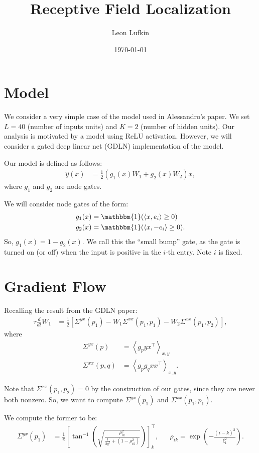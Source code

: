 \documentclass{article}
\title{Receptive Field Localization}
\author{Leon Lufkin}
\date{\today}
\begin{document}
\section{Model}
We consider a very simple case of the model used in Alessandro's paper.
We set $L = 40$ (number of inputs units) and $K = 2$ (number of hidden units).
Our analysis is motivated by a model using ReLU activation.
However, we will consider a gated deep linear net (GDLN) implementation of the model.

Our model is defined as follows:
\begin{align}
  \hat{y}(x) &= \frac{1}{2} \left( g_1(x) W_1 + g_2(x) W_2 \right) x, \label{eq:model}
\end{align}
where $g_1$ and $g_2$ are node gates.

We will consider node gates of the form:
\begin{align}
  g_1(x) &= \mathbbm{1}( \langle x, e_i \rangle \geq 0 ) \\
  g_2(x) &= \mathbbm{1}( \langle x, -e_i \rangle \geq 0 ).
\end{align}
So, $g_1(x) = 1 - g_2(x)$.
We call this the ``small bump'' gate, as the gate is turned on (or off) when the input is positive in the $i$-th entry.
Note $i$ is fixed.

\section{Gradient Flow}
Recalling the result from the GDLN paper:
\begin{align}
  \tau \frac{d}{dt} W_1 &= \frac{1}{2} \left[ \Sigma^{yx}(p_1) - W_1 \Sigma^{xx}(p_1,p_1) - W_2 \Sigma^{xx}(p_1,p_2) \right], \label{eq:grad_flow}
\end{align}
where
\begin{align}
  \Sigma^{yx}(p) &= \left\langle g_p y x^\top \right\rangle_{x,y} \\
  \Sigma^{xx}(p,q) &= \left\langle g_p g_q x x^\top \right\rangle_{x,y}.
\end{align}

Note that $\Sigma^{xx}(p_1,p_2) = 0$ by the construction of our gates, since they are never both nonzero.
So, we want to compute $\Sigma^{yx}(p_1)$ and $\Sigma^{xx}(p_1,p_1)$.

We compute the former to be:
\begin{align}
  \Sigma^{yx}(p_1) &= \frac{1}{\pi} \left[ \tan^{-1} \left( \sqrt{ \frac{ \rho_{ik}^2 }{ \frac{1}{2g^2} + (1 - \rho_{ik}^2) } } \right) \right]_k^\top, \label{eq:sig_yx}
  &&\rho_{ik} = \exp\left( - \frac{(i-k)^2}{\xi_1^2} \right).
\end{align}
\end{document}
